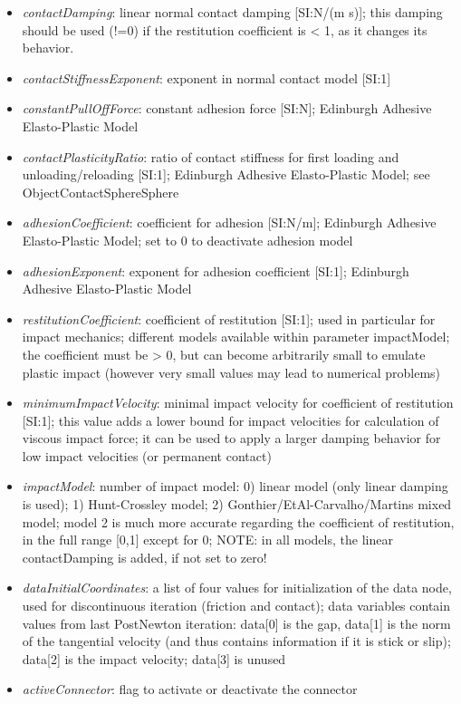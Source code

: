 \begin{itemize}[leftmargin=0.7cm]
\begin{itemize}[leftmargin=1.2cm]
\item[]{\it contactDamping}: linear normal contact damping [SI:N/(m s)]; this damping should be used (!=0) if the restitution coefficient is < 1, as it changes its behavior.
\item[]{\it contactStiffnessExponent}: exponent in normal contact model [SI:1]
\item[]{\it constantPullOffForce}: constant adhesion force [SI:N]; Edinburgh Adhesive Elasto-Plastic Model
\item[]{\it contactPlasticityRatio}: ratio of contact stiffness for first loading and unloading/reloading [SI:1]; Edinburgh Adhesive Elasto-Plastic Model; see ObjectContactSphereSphere
\item[]{\it adhesionCoefficient}: coefficient for adhesion [SI:N/m]; Edinburgh Adhesive Elasto-Plastic Model; set to 0 to deactivate adhesion model
\item[]{\it adhesionExponent}: exponent for adhesion coefficient [SI:1]; Edinburgh Adhesive Elasto-Plastic Model
\item[]{\it restitutionCoefficient}: coefficient of restitution [SI:1]; used in particular for impact mechanics; different models available within parameter impactModel; the coefficient must be > 0, but can become arbitrarily small to emulate plastic impact (however very small values may lead to numerical problems)
\item[]{\it minimumImpactVelocity}: minimal impact velocity for coefficient of restitution [SI:1]; this value adds a lower bound for impact velocities for calculation of viscous impact force; it can be used to apply a larger damping behavior for low impact velocities (or permanent contact)
\item[]{\it impactModel}: number of impact model: 0) linear model (only linear damping is used); 1) Hunt-Crossley model; 2) Gonthier/EtAl-Carvalho/Martins mixed model; model 2 is much more accurate regarding the coefficient of restitution, in the full range [0,1] except for 0; NOTE: in all models, the linear contactDamping is added, if not set to zero!
\item[]{\it dataInitialCoordinates}: a list of four values for initialization of the data node, used for discontinuous iteration (friction and contact); data variables contain values from last PostNewton iteration: data[0] is the gap, data[1] is the norm of the tangential velocity (and thus contains information if it is stick or slip); data[2] is the impact velocity; data[3] is unused
\item[]{\it activeConnector}: flag to activate or deactivate the connector

\end{itemize}
\end{itemize}
